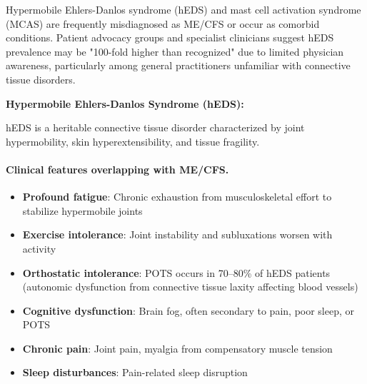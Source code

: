 \begin{observation}
\label{obs:eds-mcas-mecfs}
Hypermobile Ehlers-Danlos syndrome (hEDS) and mast cell activation syndrome (MCAS) are frequently misdiagnosed as ME/CFS or occur as comorbid conditions. Patient advocacy groups and specialist clinicians suggest hEDS prevalence may be "100-fold higher than recognized" due to limited physician awareness, particularly among general practitioners unfamiliar with connective tissue disorders.

\textbf{Hypermobile Ehlers-Danlos Syndrome (hEDS):}

hEDS is a heritable connective tissue disorder characterized by joint hypermobility, skin hyperextensibility, and tissue fragility.

\paragraph{Clinical features overlapping with ME/CFS.}
\begin{itemize}
    \item \textbf{Profound fatigue}: Chronic exhaustion from musculoskeletal effort to stabilize hypermobile joints
    \item \textbf{Exercise intolerance}: Joint instability and subluxations worsen with activity
    \item \textbf{Orthostatic intolerance}: POTS occurs in 70--80\% of hEDS patients (autonomic dysfunction from connective tissue laxity affecting blood vessels)
    \item \textbf{Cognitive dysfunction}: Brain fog, often secondary to pain, poor sleep, or POTS
    \item \textbf{Chronic pain}: Joint pain, myalgia from compensatory muscle tension
    \item \textbf{Sleep disturbances}: Pain-related sleep disruption
\end{itemize}


\end{observation}
